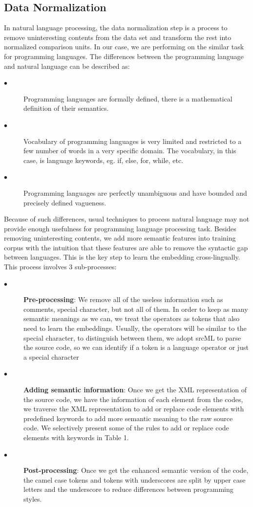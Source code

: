 \subsection{Data Normalization}
\label{sub:normalization}
In natural language processing, the data normalization step is a process to remove uninteresting contents from the data set and transform the rest into normalized comparison units. In our case, we are performing on the similar task for programming languages. The differences between the programming language and natural language can be described as:
\begin{description}
	\item [$\bullet$] Programming languages are formally defined, there is a mathematical definition of their semantics.
	\item [$\bullet$] Vocabulary of programming languages is very limited and restricted to a few number of words in a very specific domain. The vocabulary, in this case, is language keywords, eg. if, else, for, while, etc.
	\item [$\bullet$] Programming languages are perfectly unambiguous and have bounded and precisely defined vagueness.
\end{description}
Because of such differences, usual techniques to process natural language may not provide enough usefulness for programming language processing task.
Besides removing uninteresting contents, we add more semantic features into training corpus with the intuition that these features are able to remove the syntactic gap between languages. This is the key step to learn the embedding cross-lingually. This process involves 3 sub-processes:

\begin{description}
	\item [$\bullet$] \textbf{Pre-processing}: We remove all of the useless information such as comments, special character, but not all of them. In order to keep as many semantic meanings as we can, we treat the operators as tokens that also need to learn the embeddings. Usually, the operators will be similar to the special character, to distinguish between them, we adopt srcML \cite{collard2011lightweight} to parse the source code, so we can identify if a token is a language operator or just a special character
	\item [$\bullet$] \textbf{Adding semantic information}: Once we get the XML representation of the source code, we have the information of each element from the codes, we traverse the XML representation to add or replace code elements with predefined keywords to add more semantic meaning to the raw source code. We selectively present some of the rules to add or replace code elements with keywords in Table 1.
	\item [$\bullet$] \textbf{Post-processing}: Once we get the enhanced semantic version of the code, the camel case tokens and tokens with underscores are split by upper case letters and the underscore to reduce differences between programming styles.
\end{description}

